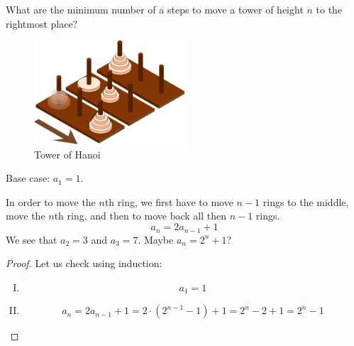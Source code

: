 \documentclass[00_complete]{subfiles}
\begin{document}
\begin{example}
    What are the minimum number of a steps to move a tower of height $n$ to the rightmost
    place?

    \begin{figure}[ht]
  \centering
    \includegraphics[width=0.5\textwidth]{w8-tower}
    \caption{Tower of Hanoi}
\end{figure}

    Base case: $a_1=1$.

    In order to move the $n$th ring, we first have to move $n-1$ rings to the
    middle, move the $n$th ring, and then to move back all then $n-1$ rings.
    $$a_n=2a_{n-1}+1$$
    We see that $a_2=3$ and $a_3=7$. Maybe $a_n = 2^n+1$?
    \begin{proof}
    Let us check using induction:
    \begin{enumerate}[I.]
        \item \begin{equation}
            a_1=1 \tag{\checkmark}
        \end{equation}
        \item \begin{equation}
            a_n = 2a_{n-1}+1=2\cdot(2^{n-1}-1)+1=2^n-2+1=2^n-1
            \tag{\checkmark}
        \end{equation}
    \end{enumerate}
    \end{proof}
\end{example}
\end{document}
